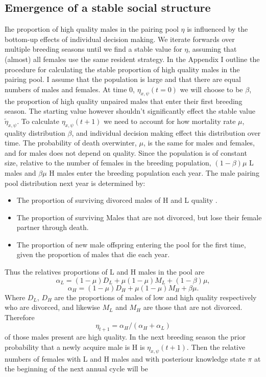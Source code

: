 \documentclass[10pt]{article}
\begin{document}
\subsection{Emergence of a stable social structure}
Ihe proportion of high quality males in the pairing pool $ \eta $ is influenced by the bottom-up effects of individual decision making. We iterate forwards over multiple breeding seasons until we find a stable value for $ \eta $, assuming that (almost) all females use the same resident strategy. In the Appendix I outline the procedure for calculating the stable proportion of high quality males in the pairing pool. I assume that the population is large and that there are equal numbers of males and females. At time 0, $ \eta_{x,\psi}(t=0) $ we will choose to be $ \beta $, the proportion of high quality unpaired males that enter their first breeding season. The starting value however shouldn't significantly effect the stable value $ \tilde{\eta}_{x,\psi}$. To calculate $\eta_{x,\psi}(t+1) $ we need to account for how mortality rate $ \mu $, quality distribution $ \beta $, and individual decision making effect this distribution over time. The probability of death overwinter, $\mu$, is the same for males and females, and for males does not depend on quality. Since the population is of constant size, relative to the number of females in the breeding population, $(1-\beta)\mu$ L males and $\beta \mu$ H males enter the breeding population each year. The male pairing pool distribution next year is determined by: 
\begin{itemize}
	\item The proportion of surviving divorced males of H and L quality . 
	\item The proportion of surviving Males that are not divorced, but lose their female partner through
	death.
	\item The proportion of new male offspring entering the pool for the first time, given the proportion of males that die each year. 
\end{itemize}
Thus the relatives proportions of L and H males in the pool are
\[
\alpha_{L}=(1-\mu)D_{L}+\mu(1-\mu)M_{L}+(1-\beta)\mu,
\]
\[
\alpha_{H}=(1-\mu)D_{H}+\mu(1-\mu)M_{H}+\beta\mu.
\]
Where $D_L$, $D_H$ are the proportions of males of low and high quality respectively who are divorced, and likewise $M_L$ and $M_H$ are those that are not divorced. Therefore 
\[ 
\eta_{t+1}=\alpha_{H}/(\alpha_{H}+\alpha_{L}) 
\] 
of those males present are high quality. In the next breeding season the prior probability that a newly acquire male is H is $\eta_{x,\psi}(t+1)$. Then the relative numbers of females with L and H males and with posteriour knowledge state $\pi$ at the beginning of the next annual cycle will be 
\end{document}
